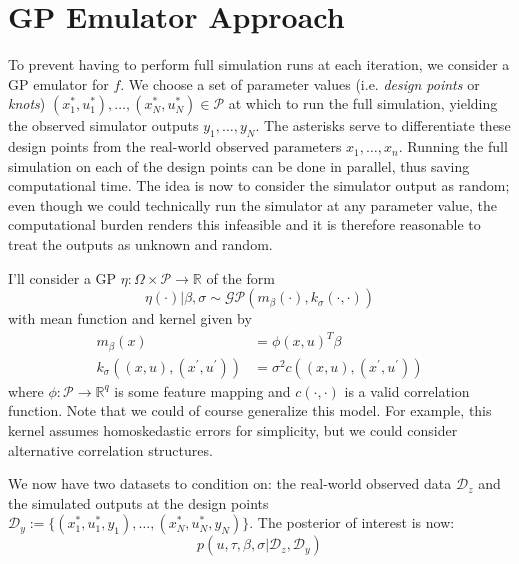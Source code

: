 \documentclass[12pt]{article}
\newcommand{\R}{\mathcal{R}}
\def\R{\mathbb{R}}
\begin{document}
\section{GP Emulator Approach}
To prevent having to perform full simulation runs at each iteration, we consider a GP emulator for $f$. We choose a set of parameter values (i.e. \textit{design points} or \textit{knots}) 
$(x_1^*, u_1^*), \dots, (x_N^*, u_N^*) \in \mathcal{P}$ at which to run the full simulation, yielding the observed simulator outputs $y_1, \dots, y_N$. The asterisks serve to differentiate 
these design points from the real-world observed parameters $x_1, \dots, x_n$. Running the full simulation on each of the design points can be done in parallel, 
thus saving computational time. The idea is now to consider the simulator output as random; even though we could technically run the simulator at any parameter value, the 
computational burden renders this infeasible and it is therefore reasonable to treat the outputs as unknown and random. 

I'll consider a GP $\eta: \Omega \times \mathcal{P} \to \R$ of the form 
\[\eta(\cdot)|\beta, \sigma \sim \mathcal{GP}(m_\beta(\cdot), k_\sigma(\cdot, \cdot))\]
with mean function and kernel given by 
\begin{align*}
m_\beta(x) &= \phi(x, u)^T \beta \\
k_{\sigma}((x, u), (x^\prime, u^\prime)) &= \sigma^2 c((x, u), (x^\prime, u^\prime))
\end{align*}
where $\phi: \mathcal{P} \to \R^q$ is some feature mapping and $c(\cdot, \cdot)$ is a valid correlation function. Note that we could of course generalize this model. For example, 
this kernel assumes homoskedastic errors for simplicity, but we could consider alternative correlation structures. 

We now have two datasets to condition on: the real-world observed data $\mathcal{D}_z$ and the simulated outputs at the design points 
$\mathcal{D}_y := \{(x_1^*, u_1^*, y_1), \dots, (x_N^*, u_N^*, y_N)\}$. 
The posterior of interest is now: 
\[p(u, \tau, \beta, \sigma|\mathcal{D}_z, \mathcal{D}_y)\]
\end{document}
